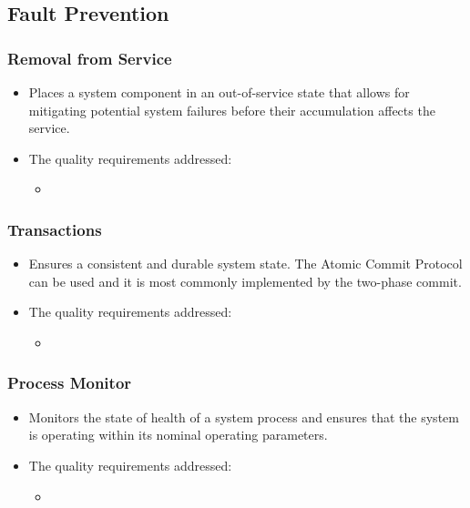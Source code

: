 \documentclass[12pt, oneside]{article}
\begin{document}
	\subsection{Fault Prevention}
		
		\subsubsection{Removal from Service}
		\begin{itemize}		
			\item Places a system component in an out-of-service state that allows for mitigating potential system failures before their accumulation affects the service.
			\item The quality requirements addressed:
			\begin{itemize}
				\item 
			\end{itemize}		
		\end{itemize}
		
		\subsubsection{Transactions}
		\begin{itemize}
			\item Ensures a consistent and durable system state. The Atomic Commit Protocol can be used and it is most commonly implemented by the two-phase commit.
			\item The quality requirements addressed:
			\begin{itemize}
				\item 
			\end{itemize}
		\end{itemize}
		
		
		\subsubsection{Process Monitor}
		\begin{itemize}
			\item Monitors the state of health of a system process and ensures that the system is operating within its nominal operating parameters.
			\item The quality requirements addressed:
			\begin{itemize}
				\item 
			\end{itemize}
		\end{itemize}
\end{document}
